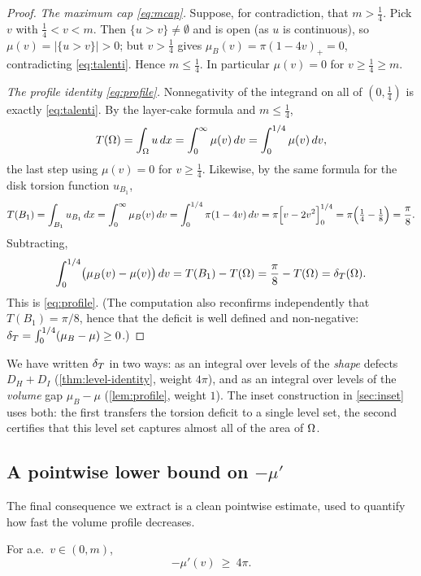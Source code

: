 \begin{proof}
\emph{The maximum cap \eqref{eq:mcap}.} Suppose, for contradiction, that
$m>\tfrac14$. Pick $v$ with $\tfrac14<v<m$. Then $\{u>v\}\ne\emptyset$ and is
open (as $u$ is continuous), so $\mu(v)=|\{u>v\}|>0$; but $v>\tfrac14$ gives
$\mu_B(v)=\pi(1-4v)_+=0$, contradicting \eqref{eq:talenti}. Hence
$m\le\tfrac14$. In particular $\mu(v)=0$ for $v\ge\tfrac14\ge m$.

\emph{The profile identity \eqref{eq:profile}.} Nonnegativity of the
integrand on all of $(0,\tfrac14)$ is exactly \eqref{eq:talenti}. By the
layer-cake formula and $m\le\tfrac14$,
\[
   T(\Omega)=\int_\Omega u\,dx=\int_0^\infty\mu(v)\,dv
   =\int_0^{1/4}\mu(v)\,dv ,
\]
the last step using $\mu(v)=0$ for $v\ge\tfrac14$. Likewise, by the same
formula for the disk torsion function $u_{B_1}$,
\[
   T(B_1)=\int_{B_1}u_{B_1}\,dx=\int_0^\infty\mu_B(v)\,dv
   =\int_0^{1/4}\pi(1-4v)\,dv
   =\pi\Bigl[v-2v^2\Bigr]_0^{1/4}
   =\pi\Bigl(\tfrac14-\tfrac18\Bigr)=\frac\pi8 .
\]
Subtracting,
\[
   \int_0^{1/4}\bigl(\mu_B(v)-\mu(v)\bigr)\,dv
   =T(B_1)-T(\Omega)=\frac\pi8-T(\Omega)=\delta_T(\Omega).
\]
This is \eqref{eq:profile}. (The computation also reconfirms
independently that $T(B_1)=\pi/8$, hence that the deficit is well defined and
non-negative: $\delta_T=\int_0^{1/4}(\mu_B-\mu)\ge0$.)
\end{proof}

\begin{remark}\label{rem:two}
We have written $\delta_T$ in two ways: as an integral over levels of the
\emph{shape} defects $D_H+D_I$ (\cref{thm:level-identity}, weight $4\pi$), and
as an integral over levels of the \emph{volume} gap $\mu_B-\mu$
(\cref{lem:profile}, weight $1$). The inset construction in \cref{sec:inset}
uses both: the first transfers the torsion deficit to a single level set, the
second certifies that this level set captures almost all of the area of
$\Omega$.
\end{remark}

\subsection{A pointwise lower bound on \texorpdfstring{$-\mu'$}{-mu'}}

The final consequence we extract is a clean pointwise estimate, used to
quantify how fast the volume profile decreases.

\begin{lemma}\label{lem:muprime}
For a.e.\ $v\in(0,m)$,
\begin{equation}\label{eq:muprime}
   -\mu'(v)\ \ge\ 4\pi .
\end{equation}
\end{lemma}

